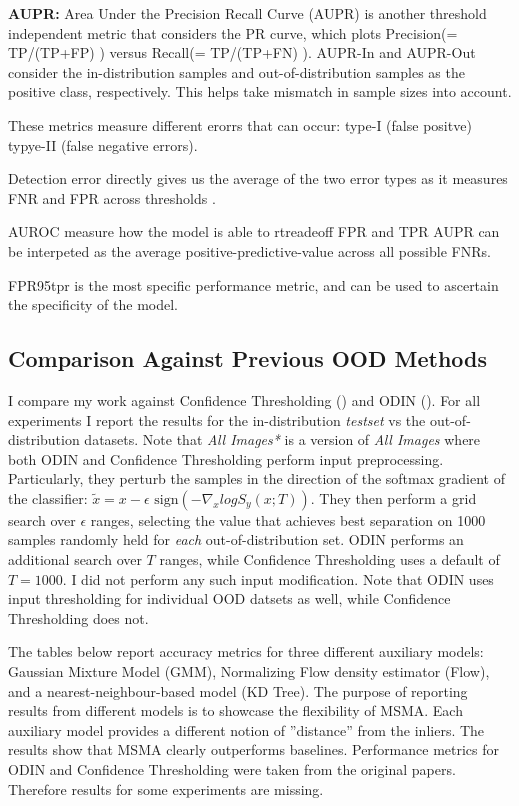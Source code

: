 \textbf{AUPR:} Area Under the Precision Recall Curve (AUPR) is another threshold independent metric that considers the PR curve, which plots Precision(= TP/(TP+FP) ) versus Recall(= TP/(TP+FN) ). AUPR-In and AUPR-Out consider the in-distribution samples and out-of-distribution samples as the positive class, respectively. This helps take mismatch in sample sizes into account.

These metrics measure different erorrs that can occur: type-I (false positve) typye-II (false negative errors).

Detection error directly gives us the average of the two error types as it measures FNR and FPR across thresholds .  

AUROC measure how the model is able to rtreadeoff FPR and TPR
AUPR can be interpeted as the average positive-predictive-value across all possible FNRs.  


FPR95tpr is the most specific performance metric, and can be used to ascertain the specificity of the model.



\subsection*{Comparison Against Previous OOD Methods}
\label{ood_experiments}

I compare my work against Confidence Thresholding (\cite{Devries}) and ODIN (\cite{Liang2017}). For all experiments I report the results for the in-distribution \textit{testset} vs the out-of-distribution datasets. Note that \textit{All Images*} is a version of \textit{All Images} where both ODIN and Confidence Thresholding perform input preprocessing. Particularly, they perturb the samples in the direction of the softmax gradient of the classifier:
$\tilde{x} = x - \epsilon \text{ sign} (- \nabla_x log S_y(x;T))$.
They then perform a grid search over $\epsilon$ ranges, selecting the value that achieves best separation on 1000 samples randomly held for \textit{each} out-of-distribution set. ODIN performs an additional search over $T$ ranges, while Confidence Thresholding uses a default of $T=1000$. I did not perform any such input modification. Note that ODIN uses input thresholding for individual OOD datsets as well, while Confidence Thresholding does not. 

The tables below report accuracy metrics for three different
auxiliary models: Gaussian Mixture Model (GMM), Normalizing Flow density estimator (Flow),
and a nearest-neighbour-based model (KD Tree). The purpose of reporting results from different
models is to showcase the flexibility of MSMA. Each auxiliary model provides a different
notion of ''distance” from the inliers. The results show that MSMA clearly outperforms baselines. Performance metrics for ODIN and Confidence Thresholding were taken from the original papers. Therefore results for some experiments are missing. 

